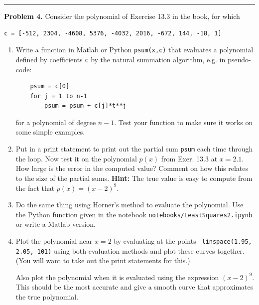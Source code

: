 \documentclass[10pt]{article}
\begin{document}



\vskip 1cm
\hrule
{\bf Problem 4.}
Consider the polynomial of Exercise 13.3 in the book, for which
\begin{verbatim}
c = [-512, 2304, -4608, 5376, -4032, 2016, -672, 144, -18, 1]
\end{verbatim} 

\begin{enumerate}
\item Write a function in Matlab or Python {\tt psum(x,c)} that evaluates a
polynomial defined by coefficients {\tt c}  by the natural summation
algorithm, e.g. in pseudo-code:
\begin{verbatim}
    psum = c[0]
    for j = 1 to n-1
        psum = psum + c[j]*t**j
\end{verbatim}
for a polynomial of degree $n-1$.
Test your function to make sure it works on some simple examples.

\item

Put in a print statement to print out the partial sum {\tt psum} each
time through the loop.  Now test it on the polynomial $p(x)$ from Exer. 13.3
at $x = 2.1$.  How large is the error in the computed value?
Comment on how this relates to the size of the partial sums.
{\bf Hint:} The true value is easy to compute from the fact that $p(x) =
(x-2)^9$.

\item Do the same thing using Horner's method to evaluate the polynomial.
Use the Python function given in the
notebook {\tt notebooks/LeastSquares2.ipynb} or write a Matlab version.

\item Plot the polynomial near $x=2$ by evaluating at the points {\tt
linspace(1.95, 2.05, 101)} using both evaluation methods and plot these
curves together. (You will want to take out the print statements for this.)  

Also plot the polynomial when it is evaluated using the
expression $(x-2)^9$.  This should be the most accurate and give a smooth
curve that approximates the true polynomial.
\end{enumerate} 

\end{document}

